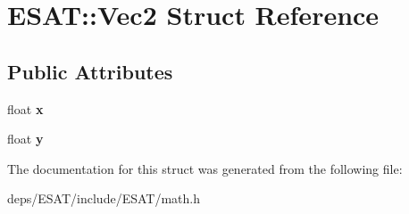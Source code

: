 \hypertarget{struct_e_s_a_t_1_1_vec2}{}\section{E\+S\+AT\+:\+:Vec2 Struct Reference}
\label{struct_e_s_a_t_1_1_vec2}
\subsection*{Public Attributes}
\begin{DoxyCompactItemize}
\item 
\mbox{\label{struct_e_s_a_t_1_1_vec2_a2a3e08e024cf00ef8239dc2296c160f9}} 
float {\bfseries x}
\item 
\mbox{\label{struct_e_s_a_t_1_1_vec2_a2796f37aacc7bb77137375eb35c1e877}} 
float {\bfseries y}
\end{DoxyCompactItemize}


The documentation for this struct was generated from the following file\+:\begin{DoxyCompactItemize}
\item 
deps/\+E\+S\+A\+T/include/\+E\+S\+A\+T/math.\+h\end{DoxyCompactItemize}

